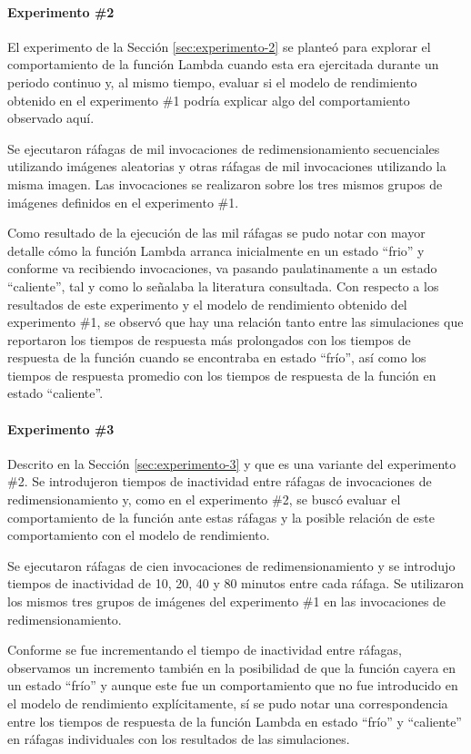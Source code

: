\paragraph{Experimento \#2} El experimento de la Sección \ref{sec:experimento-2} se planteó para explorar el comportamiento de la función Lambda cuando esta era ejercitada durante un periodo continuo y, al mismo tiempo, evaluar si el modelo de rendimiento obtenido en el experimento \#1 podría explicar algo del comportamiento observado aquí.

Se ejecutaron ráfagas de mil invocaciones de redimensionamiento secuenciales utilizando imágenes aleatorias y otras ráfagas de mil invocaciones utilizando la misma imagen. Las invocaciones se realizaron sobre los tres mismos grupos de imágenes definidos en el experimento \#1.

Como resultado de la ejecución de las mil ráfagas se pudo notar con mayor detalle cómo la función Lambda arranca inicialmente en un estado ``frio'' y conforme va recibiendo invocaciones, va pasando paulatinamente a un estado ``caliente'', tal y como lo señalaba la literatura consultada. Con respecto a los resultados de este experimento y el modelo de rendimiento obtenido del experimento \#1, se observó que hay una relación tanto entre las simulaciones que reportaron los tiempos de respuesta más prolongados con los tiempos de respuesta de la función cuando se encontraba en estado ``frío'', así como los tiempos de respuesta promedio con los tiempos de respuesta de la función en estado ``caliente''.

\paragraph{Experimento \#3} Descrito en la Sección \ref{sec:experimento-3} y que es una variante del experimento \#2. Se introdujeron tiempos de inactividad entre ráfagas de invocaciones de redimensionamiento y, como en el experimento \#2, se buscó evaluar el comportamiento de la función ante estas ráfagas y la posible relación de este comportamiento con el modelo de rendimiento.

Se ejecutaron ráfagas de cien invocaciones de redimensionamiento y se introdujo tiempos de inactividad de 10, 20, 40 y 80 minutos entre cada ráfaga. Se utilizaron los mismos tres grupos de imágenes del experimento \#1 en las invocaciones de redimensionamiento.

Conforme se fue incrementando el tiempo de inactividad entre ráfagas, observamos un incremento también en la posibilidad de que la función cayera en un estado ``frío'' y aunque este fue un comportamiento que no fue introducido en el modelo de rendimiento explícitamente, sí se pudo notar una correspondencia entre los tiempos de respuesta de la función Lambda en estado ``frío'' y ``caliente'' en ráfagas individuales con los resultados de las simulaciones.

